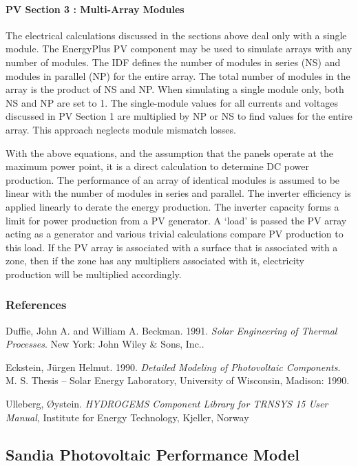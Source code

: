 \paragraph{PV Section 3 : Multi-Array Modules}\label{pv-section-3-multi-array-modules}

The electrical calculations discussed in the sections above deal only with a single module. The EnergyPlus PV component may be used to simulate arrays with any number of modules. The IDF defines the number of modules in series (NS) and modules in parallel (NP) for the entire array. The total number of modules in the array is the product of NS and NP. When simulating a single module only, both NS and NP are set to 1. The single-module values for all currents and voltages discussed in PV Section 1 are multiplied by NP or NS to find values for the entire array. This approach neglects module mismatch losses.

With the above equations, and the assumption that the panels operate at the maximum power point, it is a direct calculation to determine DC power production. The performance of an array of identical modules is assumed to be linear with the number of modules in series and parallel. The inverter efficiency is applied linearly to derate the energy production. The inverter capacity forms a limit for power production from a PV generator. A `load' is passed the PV array acting as a generator and various trivial calculations compare PV production to this load. If the PV array is associated with a surface that is associated with a zone, then if the zone has any multipliers associated with it, electricity production will be multiplied accordingly.

\subsubsection{References}\label{references-035}

Duffie, John A. and William A. Beckman. 1991. \emph{Solar Engineering of Thermal Processes}. New York: John Wiley \& Sons, Inc..

Eckstein, Jürgen Helmut. 1990. \emph{Detailed Modeling of Photovoltaic Components}. M. S. Thesis -- Solar Energy Laboratory, University of Wisconsin, Madison: 1990.

Ulleberg, Øystein. \emph{HYDROGEMS Component Library for TRNSYS 15 User Manual}, Institute for Energy Technology, Kjeller, Norway \emph{~}

\subsection{Sandia Photovoltaic Performance Model}\label{sandia-photovoltaic-performance-model}

